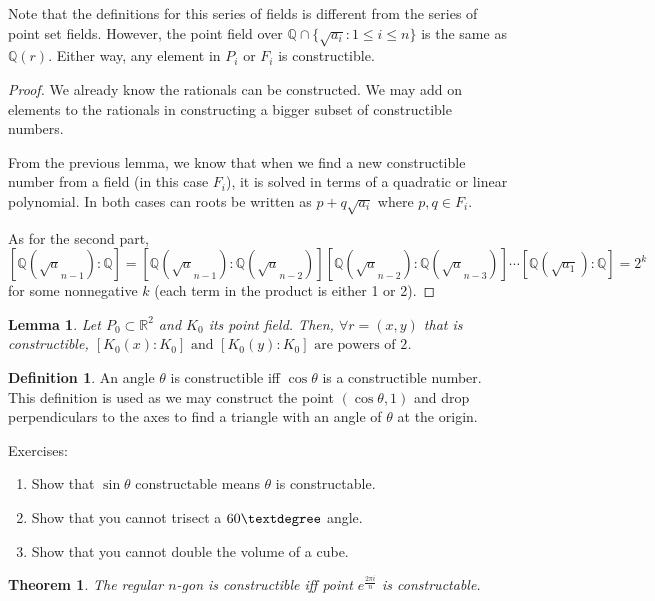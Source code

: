 \documentclass{article}
\theoremstyle{definition}
\newtheorem{definition}{Definition}
\theoremstyle{plain}
\newtheorem{theorem}{Theorem}
\theoremstyle{corollary}
\theoremstyle{lemma}
\newtheorem{lemma}{Lemma}
\begin{document}
Note that the definitions for this series of fields is different from the series of point set fields. However, the point field over $\mathbb{Q}\cap\{\sqrt{a_i}:1\leq i\leq n\}$ is the same as $\mathbb{Q}(r)$. Either way, any element in $P_i$ or $F_i$ is constructible.

\begin{proof}
    We already know the rationals can be constructed. We may add on elements to the rationals in constructing a bigger subset of constructible numbers.

    From the previous lemma, we know that when we find a new constructible number from a field (in this case $F_i$), it is solved in terms of a quadratic or linear polynomial. In both cases can roots be written as $p+q\sqrt{a_i}$ where $p,q\in F_i$.

    As for the second part, $[\mathbb{Q}(\sqrt a_{n-1}):\mathbb Q]=[\mathbb{Q}(\sqrt a_{n-1}):\mathbb{Q}(\sqrt a_{n-2})][\mathbb{Q}(\sqrt a_{n-2}):\mathbb{Q}(\sqrt a_{n-3})]\cdots[\mathbb{Q}(\sqrt{a_1}):\mathbb{Q}]=2^k$ for some nonnegative $k$ (each term in the product is either 1 or 2).
\end{proof}

\begin{lemma}
    Let $P_0\subset\mathbb{R}^2$ and $K_0$ its point field. Then, $\forall r=(x,y)$ that is constructible, $[K_0(x):K_0]\text{ and }[K_0(y):K_0]\text{ are powers of 2}$.
\end{lemma}

\begin{definition}
    An angle $\theta$ is constructible iff $\cos\theta$ is a constructible number. This definition is used as we may construct the point $(\cos\theta,1)$ and drop perpendiculars to the axes to find a triangle with an angle of $\theta$ at the origin.
\end{definition}

Exercises:
\begin{enumerate}
    \item Show that $\sin\theta$ constructable means $\theta$ is constructable.
    \item Show that you cannot trisect a $60\textdegree$ angle.
    \item Show that you cannot double the volume of a cube.
\end{enumerate}

\begin{theorem}
    The regular $n$-gon is constructible iff point $e^{\frac {2\pi i} n}$ is constructable.
\end{theorem}
\end{document}
